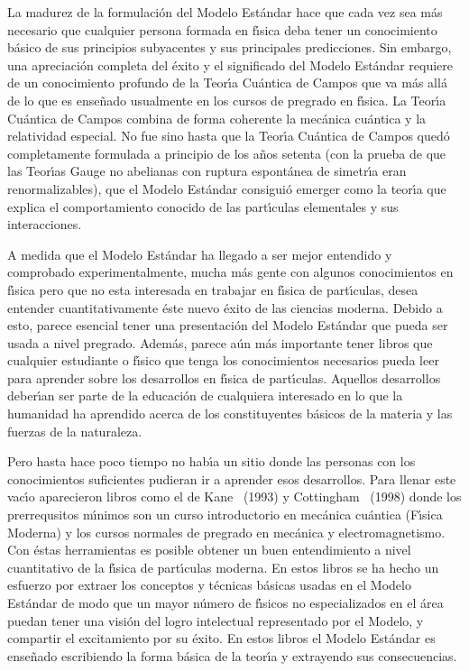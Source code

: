 La madurez de la formulaci\'on del Modelo Est\'andar hace que cada vez sea m\'as necesario que cualquier persona formada en f\'\i sica deba tener un conocimiento b\'asico de sus principios subyacentes y sus principales predicciones. Sin embargo, una apreciaci\'on completa del \'exito y el significado del Modelo Est\'andar requiere de un conocimiento profundo de la Teor\'\i a Cu\'antica de Campos que va m\'as all\'a de lo que es  ense\~nado usualmente en los cursos de pregrado en f\'\i sica. La Teor\'\i a Cu\'antica de Campos combina de forma coherente la mec\'anica cu\'antica y la relatividad especial. No fue sino hasta que la Teor\'\i a Cu\'antica de Campos qued\'o completamente formulada a principio de los a\~nos setenta (con la prueba de que las Teor\'\i as Gauge no abelianas con ruptura espont\'anea de simetr\'\i a eran renormalizables), que el Modelo Est\'andar consigui\'o emerger como la teor\'\i a que explica el comportamiento conocido de las part\'\i culas elementales y sus interacciones. 

A medida que el Modelo Est\'andar ha llegado a ser mejor entendido y comprobado experimentalmente, mucha m\'as gente con algunos conocimientos en f\'\i sica pero que no esta interesada en trabajar en f\'\i sica de part\'\i culas, desea entender cuantitativamente \'este nuevo \'exito de las ciencias moderna. Debido a esto, parece esencial tener una presentaci\'on del Modelo Est\'andar que pueda ser usada a nivel pregrado. Adem\'as, parece a\'un m\'as importante tener libros que cualquier estudiante o f\'\i sico que tenga los conocimientos necesarios pueda leer para aprender sobre los desarrollos en f\'\i sica de part\'\i culas. Aquellos desarrollos deber\'\i an ser parte de la educaci\'on de cualquiera interesado en lo que la humanidad ha aprendido acerca de los constituyentes b\'asicos de la materia y las fuerzas de la naturaleza. 

Pero hasta hace poco tiempo no hab\'\i a un sitio donde las personas con los conocimientos suficientes pudieran ir a aprender esos desarrollos. Para llenar este vac\'\i o aparecieron libros como el de Kane~\cite{kane} (1993) y Cottingham~\cite{cottingham} (1998) donde los prerrequsitos m\'\i nimos son un curso introductorio en mec\'anica cu\'antica (F\'\i sica Moderna) y los cursos normales de pregrado en mec\'anica y electromagnetismo. Con \'estas herramientas es posible obtener un buen entendimiento a nivel cuantitativo de la f\'\i sica de part\'\i culas moderna. En estos libros se ha hecho un esfuerzo por extraer los conceptos y t\'ecnicas b\'asicas usadas en el Modelo Est\'andar de modo que un mayor n\'umero de f\'\i sicos no especializados en el \'area puedan tener una visi\'on del logro intelectual representado por el Modelo, y compartir el excitamiento por su \'exito. En estos libros el Modelo Est\'andar es ense\~nado escribiendo la forma b\'asica de la teor\'\i a y extrayendo sus consecuencias. 

